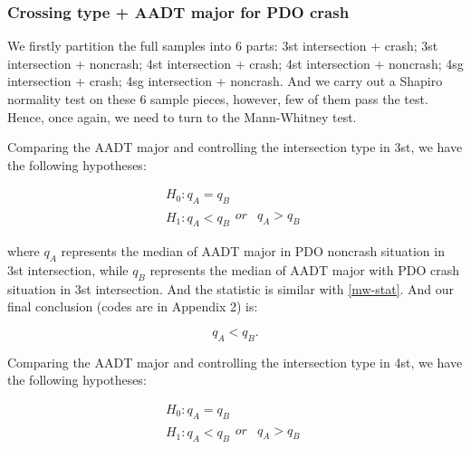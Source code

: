 \documentclass[11pt]{scrartcl} %
\begin{document}
\subsubsection{Crossing type + AADT major for PDO crash}

We firstly partition the full samples into 6 parts: 3st intersection + crash; 3st intersection + noncrash; 4st intersection + crash; 4st intersection + noncrash; 4sg intersection + crash; 4sg intersection + noncrash. And we carry out a Shapiro normality test on these 6 sample pieces, however, few of them pass the test. Hence, once again, we need to turn to the Mann-Whitney test.

\par

Comparing the AADT major and controlling the intersection type in 3st, we have the following hypotheses:

\begin{equation*}
\begin{array}{l}
{H_0}:{q_A} = {q_B}\\
{H_1}:{q_A} < {q_B}\begin{array}{*{20}{c}}
{or}&{{q_A} > {q_B}}
\end{array}
\end{array}
\end{equation*}

where $q_A$ represents the median of AADT major in PDO noncrash situation in 3st intersection, while $q_B$ represents the median of AADT major with PDO crash situation in 3st intersection. And the statistic is similar with \eqref{mw-stat}. And our final conclusion (codes are in Appendix 2) is:

\begin{equation*}
{q_A} < {q_B}.
\end{equation*}

\par

Comparing the AADT major and controlling the intersection type in 4st, we have the following hypotheses:

\begin{equation*}
\begin{array}{l}
{H_0}:{q_A} = {q_B}\\
{H_1}:{q_A} < {q_B}\begin{array}{*{20}{c}}
{or}&{{q_A} > {q_B}}
\end{array}
\end{array}
\end{equation*}
\end{document}
